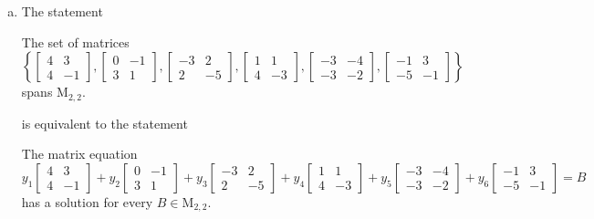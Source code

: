 \begin{exerciseAnswer}
\begin{enumerate}[(a)]
\item The statement 
\begin{center}\begin{minipage}{0.8\textwidth}
 The set of matrices \( \left\{ \left[\begin{array}{cc}
4 & 3 \\
4 & -1
\end{array}\right] , \left[\begin{array}{cc}
0 & -1 \\
3 & 1
\end{array}\right] , \left[\begin{array}{cc}
-3 & 2 \\
2 & -5
\end{array}\right] , \left[\begin{array}{cc}
1 & 1 \\
4 & -3
\end{array}\right] , \left[\begin{array}{cc}
-3 & -4 \\
-3 & -2
\end{array}\right] , \left[\begin{array}{cc}
-1 & 3 \\
-5 & -1
\end{array}\right] \right\} \) spans \(\mathrm{M}_{2,2}\). 
\end{minipage}\end{center}
     is equivalent to the statement 
\begin{center}\begin{minipage}{0.8\textwidth}
 The matrix equation \[ y_{1} \left[\begin{array}{cc}
4 & 3 \\
4 & -1
\end{array}\right] + y_{2} \left[\begin{array}{cc}
0 & -1 \\
3 & 1
\end{array}\right] + y_{3} \left[\begin{array}{cc}
-3 & 2 \\
2 & -5
\end{array}\right] + y_{4} \left[\begin{array}{cc}
1 & 1 \\
4 & -3
\end{array}\right] + y_{5} \left[\begin{array}{cc}
-3 & -4 \\
-3 & -2
\end{array}\right] + y_{6} \left[\begin{array}{cc}
-1 & 3 \\
-5 & -1
\end{array}\right] =B\] has a solution for every \(B \in \mathrm{M}_{2,2}\). 
\end{minipage}\end{center}
    

\end{enumerate}
\end{exerciseAnswer}
